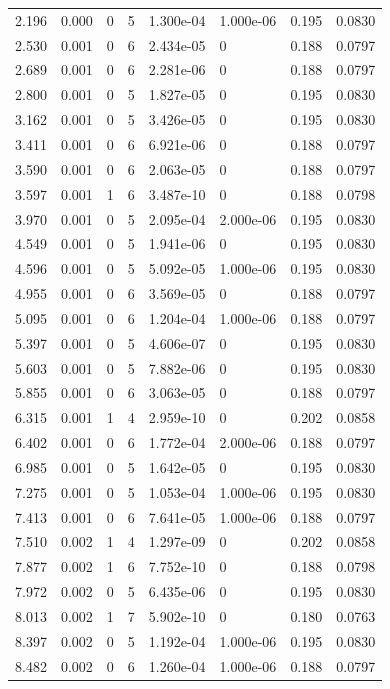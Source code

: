 \documentclass[preview]{standalone}
\begin{document}
{{\begin{tabular}{L{1.2cm}C{1.2cm} C{0.3cm}C{0.5cm} C{1.4cm}C{1.4cm} C{1.4cm}C{1.4cm}}
  2.196  &  0.000  & 0     &  5 &  1.300e-04  & 1.000e-06  & 0.195 &  0.0830   \\ 
  2.530  &  0.001  & 0     &  6 &  2.434e-05  & 0  & 0.188 &  0.0797   \\ 
  2.689  &  0.001  & 0     &  6 &  2.281e-06  & 0  & 0.188 &  0.0797   \\ 
  2.800  &  0.001  & 0     &  5 &  1.827e-05  & 0  & 0.195 &  0.0830   \\ 
  3.162  &  0.001  & 0     &  5 &  3.426e-05  & 0  & 0.195 &  0.0830   \\ 
  3.411  &  0.001  & 0     &  6 &  6.921e-06  & 0  & 0.188 &  0.0797   \\ 
  3.590  &  0.001  & 0     &  6 &  2.063e-05  & 0  & 0.188 &  0.0797   \\ 
  3.597  &  0.001  & 1     &  6 &  3.487e-10  & 0  & 0.188 &  0.0798   \\ 
  3.970  &  0.001  & 0     &  5 &  2.095e-04  & 2.000e-06  & 0.195 &  0.0830   \\ 
  4.549  &  0.001  & 0     &  5 &  1.941e-06  & 0  & 0.195 &  0.0830   \\ 
  4.596  &  0.001  & 0     &  5 &  5.092e-05  & 1.000e-06  & 0.195 &  0.0830   \\ 
  4.955  &  0.001  & 0     &  6 &  3.569e-05  & 0  & 0.188 &  0.0797   \\ 
  5.095  &  0.001  & 0     &  6 &  1.204e-04  & 1.000e-06  & 0.188 &  0.0797   \\ 
  5.397  &  0.001  & 0     &  5 &  4.606e-07  & 0  & 0.195 &  0.0830   \\ 
  5.603  &  0.001  & 0     &  5 &  7.882e-06  & 0  & 0.195 &  0.0830   \\ 
  5.855  &  0.001  & 0     &  6 &  3.063e-05  & 0  & 0.188 &  0.0797   \\ 
  6.315  &  0.001  & 1     &  4 &  2.959e-10  & 0  & 0.202 &  0.0858   \\ 
  6.402  &  0.001  & 0     &  6 &  1.772e-04  & 2.000e-06  & 0.188 &  0.0797   \\ 
  6.985  &  0.001  & 0     &  5 &  1.642e-05  & 0  & 0.195 &  0.0830   \\ 
  7.275  &  0.001  & 0     &  5 &  1.053e-04  & 1.000e-06  & 0.195 &  0.0830   \\ 
  7.413  &  0.001  & 0     &  6 &  7.641e-05  & 1.000e-06  & 0.188 &  0.0797   \\ 
  7.510  &  0.002  & 1     &  4 &  1.297e-09  & 0  & 0.202 &  0.0858   \\ 
  7.877  &  0.002  & 1     &  6 &  7.752e-10  & 0  & 0.188 &  0.0798   \\ 
  7.972  &  0.002  & 0     &  5 &  6.435e-06  & 0  & 0.195 &  0.0830   \\ 
  8.013  &  0.002  & 1     &  7 &  5.902e-10  & 0  & 0.180 &  0.0763   \\ 
  8.397  &  0.002  & 0     &  5 &  1.192e-04  & 1.000e-06  & 0.195 &  0.0830   \\ 
  8.482  &  0.002  & 0     &  6 &  1.260e-04  & 1.000e-06  & 0.188 &  0.0797   \\ 
\hline 
\end{tabular} 

}}
\end{document}
